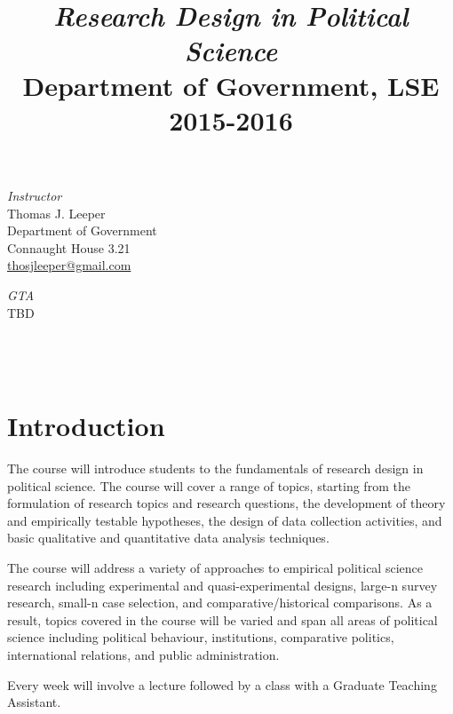 \documentclass[12pt,a4paper]{article}
\title{\textit{Research Design in Political Science}\\Department of Government, LSE\\2015-2016}
\author{}
\date{}
\begin{document}
\nobibliography*
\faketableofcontents

\maketitle

\vspace{-4em}

\begin{minipage}[b]{0.5\linewidth}
\textit{Instructor}\\
Thomas J. Leeper\\
Department of Government\\
Connaught House 3.21\\
\href{mailto:thosjleeper@gmail.com}{thosjleeper@gmail.com}\\
\end{minipage}
\begin{minipage}[b]{0.5\linewidth}
\textit{GTA}\\
TBD\\
\hspace{1em}\\
\hspace{1em}\\
\hspace{1em}\\
\end{minipage}


\section{Introduction}
The course will introduce students to the fundamentals of research design in political science. The course will cover a range of topics, starting from the formulation of research topics and research questions, the development of theory and empirically testable hypotheses, the design of data collection activities, and basic qualitative and quantitative data analysis techniques. 

The course will address a variety of approaches to empirical political science research including experimental and quasi-experimental designs, large-n survey research, small-n case selection, and comparative/historical comparisons. As a result, topics covered in the course will be varied and span all areas of political science including political behaviour, institutions, comparative politics, international relations, and public administration.

Every week will involve a lecture followed by a class with a Graduate Teaching Assistant. 
\end{document}
